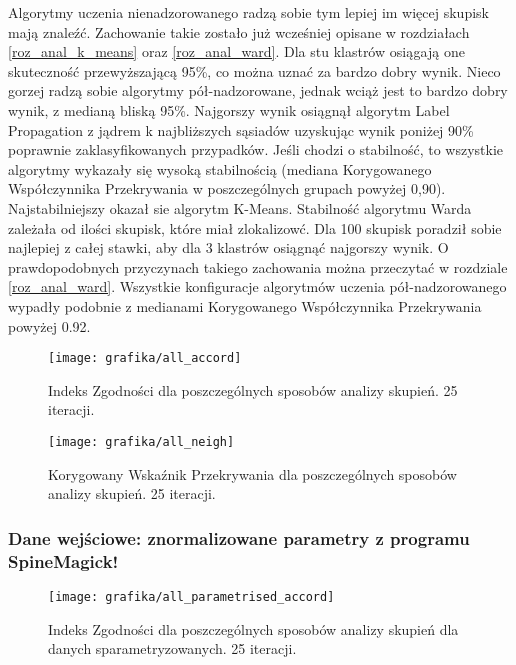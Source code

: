 \documentclass{article}
\begin{document}
Algorytmy uczenia nienadzorowanego radzą sobie tym lepiej im więcej skupisk mają znaleźć.
Zachowanie takie zostało już wcześniej opisane w rozdziałach \ref{roz_anal_k_means} oraz \ref{roz_anal_ward}.
Dla stu klastrów osiągają one skuteczność przewyższającą 95\%, co można uznać za bardzo dobry wynik.
Nieco gorzej radzą sobie algorytmy pół-nadzorowane, jednak wciąż jest to bardzo dobry wynik, z medianą bliską 95\%.
Najgorszy wynik osiągnął algorytm Label Propagation z jądrem k najbliższych sąsiadów uzyskując wynik poniżej 90\% poprawnie zaklasyfikowanych przypadków.
Jeśli chodzi o stabilność, to wszystkie algorytmy wykazały się wysoką stabilnością (mediana Korygowanego Współczynnika Przekrywania w poszczególnych grupach powyżej 0,90).
Najstabilniejszy okazał sie algorytm K-Means.
Stabilność algorytmu Warda zależała od ilości skupisk, które miał zlokalizowć.
Dla 100 skupisk poradził sobie najlepiej z całej stawki, aby dla 3 klastrów osiągnąć najgorszy wynik.
O prawdopodobnych przyczynach takiego zachowania można przeczytać w rozdziale \ref{roz_anal_ward}.
Wszystkie konfiguracje algorytmów uczenia pół-nadzorowanego wypadły podobnie z medianami Korygowanego Współczynnika Przekrywania powyżej 0.92.
\begin{figure}
\texttt{[image: grafika/all\_accord]}
\caption{Indeks Zgodności dla poszczególnych sposobów analizy skupień. 25 iteracji.}
\label{rysAllAccord}

\end{figure}


\begin{figure}
\texttt{[image: grafika/all\_neigh]}
\caption{Korygowany Wskaźnik Przekrywania dla poszczególnych sposobów analizy skupień. 25 iteracji.}
\label{rysAllNeigh}

\end{figure}

\FloatBarrier
\subsubsection{Dane wejściowe: znormalizowane parametry z programu SpineMagick!}
\label{rozPorNormParametry}

\begin{figure}
\texttt{[image: grafika/all\_parametrised\_accord]}
\caption{Indeks Zgodności dla poszczególnych sposobów analizy skupień dla danych sparametryzowanych. 25 iteracji.}
\label{rysAllParamAccord}

\end{figure}
\end{document}

